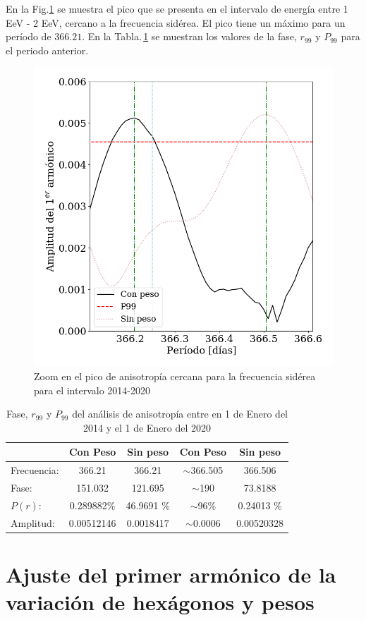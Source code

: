 En la Fig.\ref{fig:zoom} se muestra el pico que se presenta en  el intervalo de energía entre 1 EeV - 2 EeV, cercano a la frecuencia sidérea. El pico tiene un máximo para un período de $366.21$. En la Tabla.\,\ref{tabla:pico} se muestran los valores de la fase, $r_{99}$ y $P_{99}$ para el periodo anterior.

\begin{figure}[H]
	\centering
	\includegraphics[width=0.5\linewidth]{zoom_anis.png}
	\caption{Zoom en el pico de anisotropía cercana para la frecuencia sidérea para el intervalo 2014-2020}
	\label{fig:zoom}
\end{figure}



\begin{table}[H]
\centering
\begin{tabular}{l|c|c|c|c}
				& Con Peso 		& Sin peso 		& Con Peso 		& Sin peso 		\\ \hline
Frecuencia:		& 366.21 		& 366.21 		& $\sim$366.505 & 366.506 		\\
Fase:			& 151.032 		& 121.695		& $\sim$190 	& 73.8188		\\
$P(r)$:		& 0.289882\%	& 46.9691 \% 	& $\sim$96\%	& 0.24013 \% 	\\
Amplitud:		& 0.00512146	& 0.0018417		& $\sim$0.0006	& 0.00520328	\\
\end{tabular}
\caption{Fase, $r_{99}$ y $P_{99}$ del análisis de anisotropía entre en 1 de Enero del 2014 y el 1 de Enero del 2020}
\label{tabla:pico}
\end{table}


\section{Ajuste del primer armónico de la variación de hexágonos y pesos}


